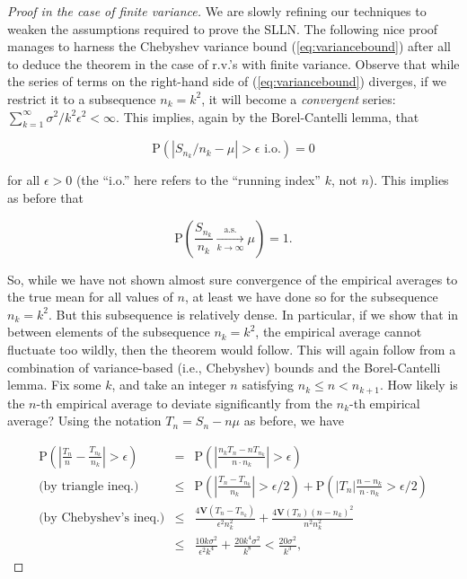 \documentclass[11pt]{report}
\theoremstyle{plain}
\theoremstyle{definition}
\begin{document}
\begin{proof}[Proof in the case of finite variance]
We are slowly refining our techniques to weaken the
assumptions required to prove the SLLN. The following
nice proof manages to harness the Chebyshev variance
bound (\ref{eq:variancebound}) after all to deduce the
theorem in the case of r.v.'s with finite variance.
Observe that while the series of terms on the
right-hand side of (\ref{eq:variancebound}) diverges, if
we restrict it to a subsequence $n_k = k^2$, it will
become a \emph{convergent} series:
$\sum_{k=1}^\infty \sigma^2/k^2\epsilon^2<\infty$.
This implies, again by the Borel-Cantelli lemma, that

\[
\mathrm{P}(|S_{n_k}/{n_k} - \mu| > \epsilon \textrm{ i.o.}) = 0
\]

for all $\epsilon>0$ (the ``i.o.'' here refers to
the ``running index'' $k$, not $n$). This implies as
before that

\[
\mathrm{P}\left(\frac{S_{n_k}}{n_k}\xrightarrow[k\to\infty]{\textrm{a.s.}} \mu\right) = 1.
\]

So, while we have not shown almost sure convergence
of the empirical averages to the true mean for all
values of $n$, at least we have done so for the
subsequence $n_k=k^2$. But this subsequence is
relatively dense. In particular, if we show that in
between elements of the subsequence $n_k=k^2$, the
empirical average cannot fluctuate too wildly, then
the theorem would follow. This will again follow from
a combination of variance-based (i.e., Chebyshev)
bounds and the Borel-Cantelli lemma. Fix some $k$,
and take an integer $n$ satisfying
$n_k\le n < n_{k+1}$. How likely is the $n$-th
empirical average to deviate significantly from the
$n_k$-th empirical average? Using the notation
$T_n=S_n-n\mu$ as before, we have

\begin{eqnarray*}
\mathrm{P}\left( \left| \frac{T_n}{n}-\frac{T_{n_k}}{n_k} \right| > \epsilon \right) &=& \mathrm{P}\left( \left|
\frac{n_k T_n - n T_{n_k}}{n\cdot n_k} \right|>\epsilon\right) \\
\textrm{(by triangle ineq.)}  &\le&
\mathrm{P}\left( \left| \frac{T_n -T_{n_k}}{n_k} \right| > \epsilon/2 \right)+ \mathrm{P}\left( \left|T_n\right| \frac{n-n_k}{n\cdot n_k}
> \epsilon/2 \right) \\
\textrm{(by Chebyshev's ineq.)} &\le&
\frac{4 \mathbf{V}(T_n-T_{n_k})}{\epsilon^2 n_k^2} + \frac{4\mathbf{V}(T_n)(n-n_k)^2}{n^2 n_k^2} \\
&\le&
\frac{10 k \sigma^2}{\epsilon^2 k^4} + \frac{20 k^4 \sigma^2}{k^8} < \frac{20 \sigma^2}{k^3},
\end{eqnarray*}


\end{proof}
\end{document}
